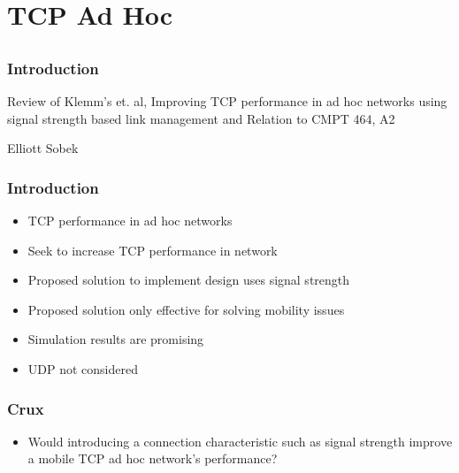 \section{TCP Ad Hoc}
\subsection*{}


\begin{frame}[t]
  \frametitle{Introduction}
  Review of Klemm’s et. al, Improving TCP performance in ad hoc networks using signal strength based link management and Relation to CMPT 464, A2

  Elliott Sobek
  \begin{flushleft}
    \begin{tiny}
      \begin{minipage}{1.0\linewidth}
      \end{minipage}
    \end{tiny}
  \end{flushleft}

  \vfill
\end{frame}

\begin{frame}[t]
  \frametitle{Introduction}
  \begin{itemize}
  \item TCP performance in ad hoc networks
  \item Seek to increase TCP performance in network
  \item Proposed solution to implement design uses signal strength
  \item Proposed solution only effective for solving mobility issues
  \item Simulation results are promising
  \item UDP not considered
  \end{itemize}

  \vfill

\end{frame}

\begin{frame}[t]
  \frametitle{Crux}
  \begin{itemize}
  \item Would introducing a connection characteristic such as signal strength improve a mobile TCP ad hoc network’s performance?
  \end{itemize}

  \vfill

\end{frame}


